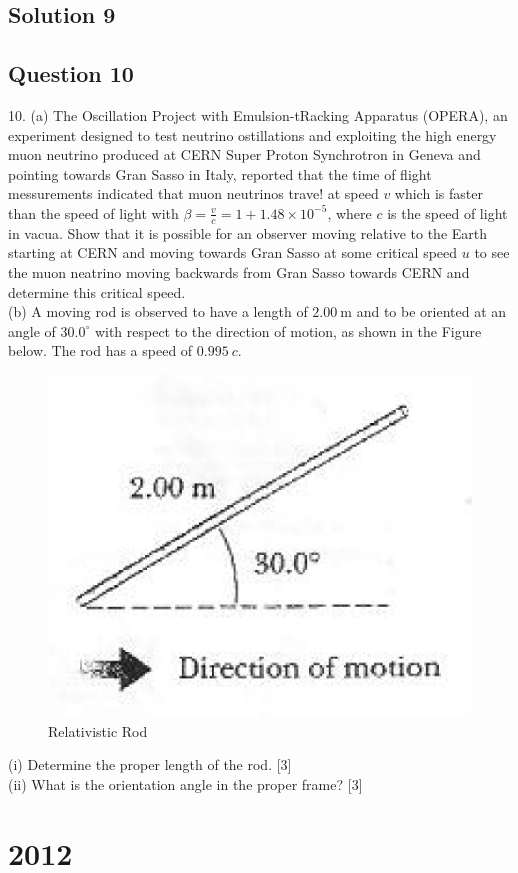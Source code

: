 \documentclass{article}
\begin{document}
\subsection{Solution 9}

\subsection{Question 10}
10. (a) The Oscillation Project with Emulsion-tRacking Apparatus (OPERA), an experiment designed to test neutrino ostillations and exploiting the high energy muon neutrino produced at CERN Super Proton Synchrotron in Geneva and pointing towards Gran Sasso in Italy, reported that the time of flight messurements indicated that muon neutrinos trave! at speed $v$ which is faster than the speed of light with $\beta=\frac{v}{c}=1+1.48 \times 10^{-5}$, where $c$ is the speed of light in vacua. Show that it is possible for an observer moving relative to the Earth starting at CERN and moving towards Gran Sasso at some critical speed $u$ to see the muon neatrino moving backwards from Gran Sasso towards CERN and determine this critical speed.\\
(b) A moving rod is observed to have a length of $2.00 \mathrm{~m}$ and to be oriented at an angle of $30.0^\circ$ with respect to the direction of motion, as shown in the Figure below. The rod has a speed of $0.995~c$.
\begin{figure}
	\centering
	\includegraphics[width=0.7\linewidth]{spho_book_TYS_images/2011q10.png}
	\caption{Relativistic Rod}
\end{figure}
(i) Determine the proper length of the rod. [3] \\
(ii) What is the orientation angle in the proper frame? [3] \\

\section{2012}
\end{document}

